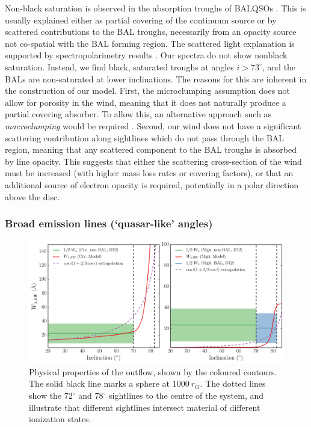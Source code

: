 \documentclass[useAMS,usenatbib]{mn2e_x}
\begin{document}
Non-black saturation is observed in the absorption troughs of BALQSOs \citep{arav1999a,arav1999b}.
This is usually explained either as  partial covering of the continuum
source or by scattered contributions to the BAL troughs, necessarily
from an opacity source not co-spatial with the BAL forming region.
The scattered light explanation is supported by spectropolarimetry results
\citep{lamy2000}. Our spectra do not show nonblack saturation.
Instead, we find black, saturated troughs at angles $i > 73^\circ$, and the BALs
are non-saturated at lower inclinations. The reasons for this are inherent in the construction of our model. 
First, the microclumping assumption does not allow for 
porosity in the wind, meaning that it does not naturally produce
a partial covering absorber. To allow this, an alternative approach
such as {\em macroclumping} would be required \citep[e.g.][]{surlan2012,hamann2008}.
Second, our wind does not have a significant scattering 
contribution along sightlines which do not pass through the BAL region,
meaning that any scattered component to the BAL troughs is absorbed by line opacity.
This suggests that either the scattering cross-section of the wind must
be increased (with higher mass loss rates or covering factors), or 
that an additional source of electron opacity is required, potentially
in a polar direction above the disc.  


\subsubsection{Broad emission lines (`quasar-like' angles)}

\begin{figure} %
\centering
\includegraphics[width=1.0\textwidth]{figures/ew.png}
\caption
{
Physical properties of the outflow, shown by the coloured contours.
The solid black line marks a sphere at $1000~r_G$.
The dotted lines show the $72^\circ$ and $78^\circ$ sightlines 
to the centre of the system, and illustrate that different sightlines
intersect material of different ionization states.
}
\label{fig:ew}
\end{figure} %
\end{document}
